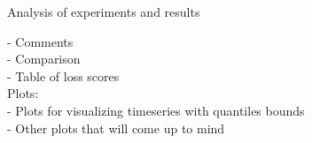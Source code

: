 Analysis of experiments and results

- Comments
\\
- Comparison
\\
- Table of loss scores
\\
Plots:
\\
- Plots for visualizing timeseries with quantiles bounds
\\
- Other plots that will come up to mind
